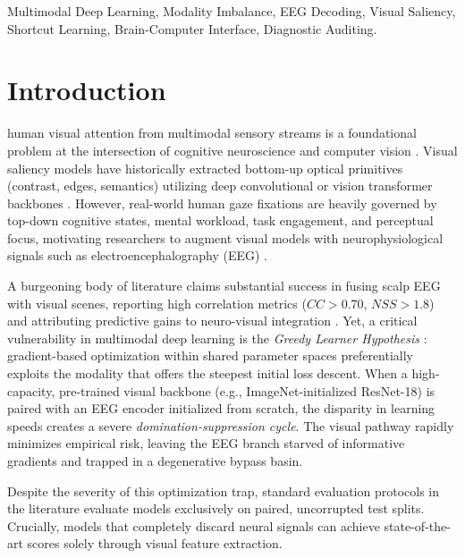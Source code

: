 \documentclass[journal,twocolumn]{IEEEtran}
\begin{document}
\begin{IEEEkeywords}
Multimodal Deep Learning, Modality Imbalance, EEG Decoding, Visual Saliency, Shortcut Learning, Brain-Computer Interface, Diagnostic Auditing.
\end{IEEEkeywords}

\section{Introduction}
 human visual attention from multimodal sensory streams is a foundational problem at the intersection of cognitive neuroscience and computer vision \cite{riesenhuber1999hierarchical, itti1998model}. Visual saliency models have historically extracted bottom-up optical primitives (contrast, edges, semantics) utilizing deep convolutional or vision transformer backbones \cite{cornia2018predicting}. However, real-world human gaze fixations are heavily governed by top-down cognitive states, mental workload, task engagement, and perceptual focus, motivating researchers to augment visual models with neurophysiological signals such as electroencephalography (EEG) \cite{kaushik2021eeg, lanillos2020review}.

A burgeoning body of literature claims substantial success in fusing scalp EEG with visual scenes, reporting high correlation metrics ($CC > 0.70$, $NSS > 1.8$) and attributing predictive gains to neuro-visual integration \cite{sugano2015self, min2021decoding, palazzo2020visual}. Yet, a critical vulnerability in multimodal deep learning is the \textit{Greedy Learner Hypothesis} \cite{wang2020makes}: gradient-based optimization within shared parameter spaces preferentially exploits the modality that offers the steepest initial loss descent. When a high-capacity, pre-trained visual backbone (e.g., ImageNet-initialized ResNet-18) is paired with an EEG encoder initialized from scratch, the disparity in learning speeds creates a severe \textit{domination-suppression cycle}. The visual pathway rapidly minimizes empirical risk, leaving the EEG branch starved of informative gradients and trapped in a degenerative bypass basin.

Despite the severity of this optimization trap, standard evaluation protocols in the literature evaluate models exclusively on paired, uncorrupted test splits. Crucially, models that completely discard neural signals can achieve state-of-the-art scores solely through visual feature extraction.
\end{document}
